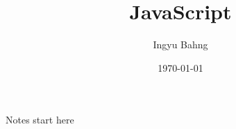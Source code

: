 \documentclass[10pt]{article}
\title{JavaScript}
\date{\today}
\author{Ingyu Bahng}
\begin{document}


Notes start here
  
\end{document}

